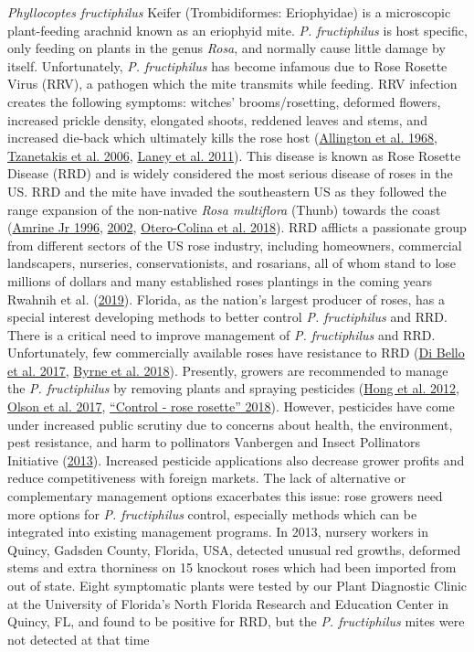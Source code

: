 \documentclass{ufdissertation}[overrideChapters] %
\begin{document}
{\emph{Phyllocoptes fructiphilus} Keifer (Trombidiformes: Eriophyidae) is a microscopic plant-feeding arachnid known as an eriophyid mite. \emph{P. fructiphilus} is host specific, only feeding on plants in the genus \emph{Rosa}, and normally cause little damage by itself. Unfortunately, \emph{P. fructiphilus} has become infamous due to Rose Rosette Virus (RRV), a pathogen which the mite transmits while feeding. RRV infection creates the following symptoms: witches' brooms/rosetting, deformed flowers, increased prickle density, elongated shoots, reddened leaves and stems, and increased die-back which ultimately kills the rose host (\protect\hyperlink{ref-Allington1968}{Allington et al. 1968}, \protect\hyperlink{ref-Tzanetakis2006}{Tzanetakis et al. 2006}, \protect\hyperlink{ref-Laney2011}{Laney et al. 2011}). This disease is known as Rose Rosette Disease (RRD) and is widely considered the most serious disease of roses in the US. RRD and the mite have invaded the southeastern US as they followed the range expansion of the non-native \emph{Rosa multiflora} (Thunb) towards the coast (\protect\hyperlink{ref-Amrine1996}{Amrine Jr 1996}, \protect\hyperlink{ref-Amrine2002}{2002}, \protect\hyperlink{ref-Otero-Colina2018}{Otero-Colina et al. 2018}). RRD afflicts a passionate group from different sectors of the US rose industry, including homeowners, commercial landscapers, nurseries, conservationists, and rosarians, all of whom stand to lose millions of dollars and many established roses plantings in the coming years Rwahnih et al. (\protect\hyperlink{ref-Rwahnih2019}{2019}). Florida, as the nation's largest producer of roses, has a special interest developing methods to better control \emph{P. fructiphilus} and RRD. There is a critical need to improve management of \emph{P. fructiphilus} and RRD. Unfortunately, few commercially available roses have resistance to RRD (\protect\hyperlink{ref-Bello2017}{Di Bello et al. 2017}, \protect\hyperlink{ref-Byrne2018}{Byrne et al. 2018}). Presently, growers are recommended to manage the \emph{P. fructiphilus} by removing plants and spraying pesticides (\protect\hyperlink{ref-Hong2012}{Hong et al. 2012}, \protect\hyperlink{ref-Olson2017}{Olson et al. 2017}, \protect\hyperlink{ref-UGA2018}{{``Control - rose rosette''} 2018}). However, pesticides have come under increased public scrutiny due to concerns about health, the environment, pest resistance, and harm to pollinators Vanbergen and Insect Pollinators Initiative (\protect\hyperlink{ref-Vanbergen2013}{2013}). Increased pesticide applications also decrease grower profits and reduce competitiveness with foreign markets. The lack of alternative or complementary management options exacerbates this issue: rose growers need more options for \emph{P. fructiphilus} control, especially methods which can be integrated into existing management programs. In 2013, nursery workers in Quincy, Gadsden County, Florida, USA, detected unusual red growths, deformed stems and extra thorniness on 15 knockout roses which had been imported from out of state. Eight symptomatic plants were tested by our Plant Diagnostic Clinic at the University of Florida's North Florida Research and Education Center in Quincy, FL, and found to be positive for RRD, but the \emph{P. fructiphilus} mites were not detected at that time }
\end{document}
